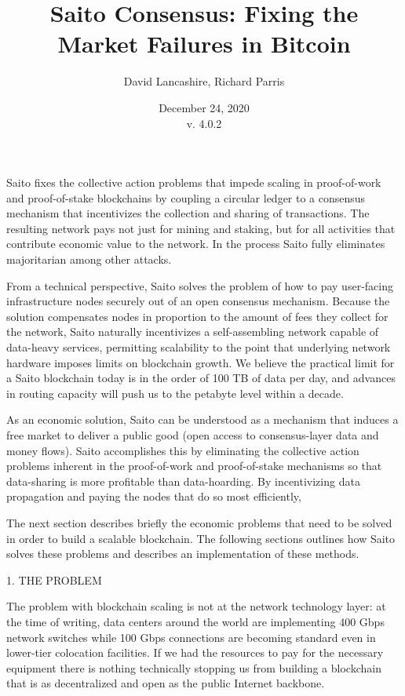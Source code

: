 \documentclass[11pt, oneside]{article}   	%
\title{Saito Consensus: Fixing the Market Failures in Bitcoin }
\author{David Lancashire, Richard Parris }
\date{December 24, 2020\\v. 4.0.2}
\begin{document}
\maketitle


\begin{onecolabstract}
Saito fixes the collective action problems that impede scaling in proof-of-work and proof-of-stake blockchains by coupling a circular ledger to a consensus mechanism that incentivizes the collection and sharing of transactions. The resulting network pays not just for mining and staking, but for all activities that contribute economic value to the network. In the process Saito fully eliminates majoritarian among other attacks.
\end{onecolabstract}

\begin{multicols}{2}
From a technical perspective, Saito solves the problem of how to pay user-facing infrastructure nodes securely out of an open consensus mechanism. Because the solution compensates nodes in proportion to the amount of fees they collect for the network, Saito naturally incentivizes a self-assembling network capable of data-heavy services, permitting scalability to the point that underlying network hardware imposes limits on blockchain growth. We believe the practical limit for a Saito blockchain today is in the order of 100 TB of data per day, and advances in routing capacity will push us to the petabyte level within a decade.

As an economic solution, Saito can be understood as a mechanism that induces a free market to deliver a public good (open access to consensus-layer data and money flows). Saito accomplishes this by eliminating the collective action problems inherent in the proof-of-work and proof-of-stake mechanisms so that data-sharing is more profitable than data-hoarding. By incentivizing data propagation and paying the nodes that do so most efficiently, 

The next section describes briefly the economic problems that need to be solved in order to build a scalable blockchain. The following sections outlines how Saito solves these problems and describes an implementation of these methods.


1. THE PROBLEM

The problem with blockchain scaling is not at the network technology layer: at the time of writing, data centers around the world are implementing 400 Gbps network switches while 100 Gbps connections are becoming standard even in lower-tier colocation facilities. If we had the resources to pay for the necessary equipment there is nothing technically stopping us from building a blockchain that is as decentralized and open as the public Internet backbone.


\end{multicols}
\end{document}
